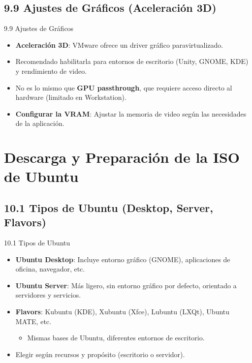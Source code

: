\documentclass{beamer}
\begin{document}
\subsection{9.9 Ajustes de Gráficos (Aceleración 3D)}
\begin{frame}{9.9 Ajustes de Gráficos}
	\begin{itemize}
		\item \textbf{Aceleración 3D}: VMware ofrece un driver gráfico paravirtualizado.
		\item Recomendado habilitarla para entornos de escritorio (Unity, GNOME, KDE) y rendimiento de video.
		\item No es lo mismo que \textbf{GPU passthrough}, que requiere acceso directo al hardware (limitado en Workstation).
		\item \textbf{Configurar la VRAM}: Ajustar la memoria de video según las necesidades de la aplicación.
	\end{itemize}
\end{frame}

\section{Descarga y Preparación de la ISO de Ubuntu}

\subsection{10.1 Tipos de Ubuntu (Desktop, Server, Flavors)}
\begin{frame}{10.1 Tipos de Ubuntu}
	\begin{itemize}
		\item \textbf{Ubuntu Desktop}: Incluye entorno gráfico (GNOME), aplicaciones de oficina, navegador, etc.
		\item \textbf{Ubuntu Server}: Más ligero, sin entorno gráfico por defecto, orientado a servidores y servicios.
		\item \textbf{Flavors}: Kubuntu (KDE), Xubuntu (Xfce), Lubuntu (LXQt), Ubuntu MATE, etc.  
			\begin{itemize}
				\item Mismas bases de Ubuntu, diferentes entornos de escritorio.
			\end{itemize}
		\item Elegir según recursos y propósito (escritorio o servidor).
	\end{itemize}
\end{frame}
\end{document}
